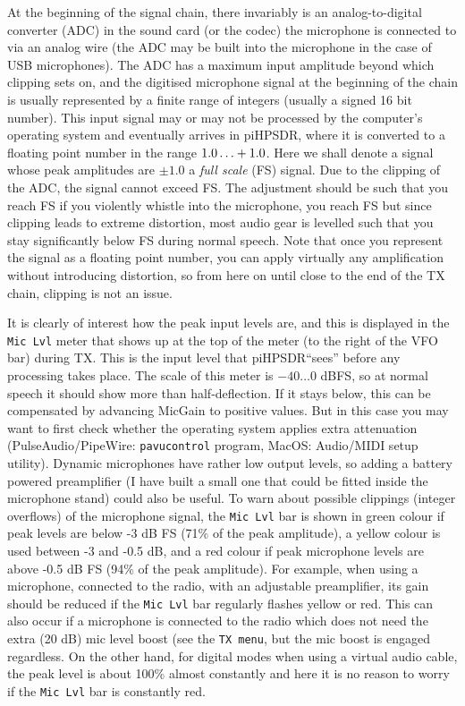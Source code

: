 \documentclass[12pt]{book}
\def\bltt#1{\texttt{\color{blue}#1}}
\def\pH{pi\-HPSDR\xspace}
\begin{document}
At the beginning of the signal chain, there invariably is an analog-to-digital converter (ADC)
in the sound card (or the codec) the microphone is connected to via an analog wire (the ADC may
be built into the microphone in the case of USB microphones). The ADC has a maximum input amplitude
beyond which clipping sets on, and the digitised microphone signal at the beginning of the chain
is usually represented by a finite range of integers (usually a signed 16 bit number). This input signal
may or may not be processed by the computer's operating system and eventually arrives in \pH, where it
is converted to a floating point number in the range $\-1.0\ldots+1.0$. Here we shall denote a signal
whose peak amplitudes are $\pm 1.0$ a \textit{full scale} (FS) signal. Due to the clipping of the ADC,
the signal cannot exceed FS. The adjustment should be such that you reach FS if you violently
whistle into the microphone, you reach FS but since clipping leads to extreme distortion, most audio
gear is levelled such that you stay significantly below FS during normal speech. Note that once you
represent the signal as a floating point number, you can apply virtually any amplification without
introducing distortion, so from here on until close to the end of the TX chain, clipping is not an issue.

It is clearly of interest how the peak input levels are, and this is displayed in the \texttt{Mic Lvl}
meter that shows up at the top of the meter (to the right of the VFO bar) during TX. This is the input
level that \pH ``sees'' before any processing takes place. The scale of this meter is $-40\ldots 0$ dBFS,
so at normal speech it should show more than half-deflection. If it stays below, this can be
compensated by advancing MicGain to positive values. But in this case you may want to first check
whether  the operating system applies extra attenuation (PulseAudio/PipeWire: \texttt{pavucontrol} program,
 MacOS: Audio/MIDI setup utility). Dynamic microphones have rather low  output levels, so
adding a battery powered preamplifier (I have built a small one that could be fitted inside
the microphone stand) could also be useful. To warn about possible clippings (integer overflows) of the
microphone signal, the \texttt{Mic Lvl} bar
is shown in green colour if peak levels are below -3 dB FS (71\% of the peak amplitude), a yellow colour is used
between -3 and -0.5 dB,  and a red colour if peak microphone levels are above -0.5 dB FS (94\% of the peak amplitude).
 For example, when using a microphone, connected to the radio, with an adjustable preamplifier,
its gain should be reduced if the \texttt{Mic Lvl} bar regularly flashes yellow or red.
This can also occur if a microphone is connected to the radio which does not need the extra (20 dB)
mic level boost (see the \bltt{TX menu}, but the mic boost is engaged  regardless.
On the other hand,
for digital modes when using a virtual audio cable, the peak level is about 100\% almost constantly
and here it is no reason to worry if the \texttt{Mic Lvl} bar is constantly red.
\end{document}

